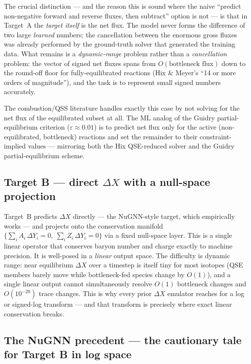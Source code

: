 \documentclass[11pt]{article}
\begin{document}
The crucial distinction --- and the reason this is sound where the naive ``predict non-negative forward and reverse fluxes, then subtract'' option is not --- is that in Target~A the \emph{target itself} is the net flux. The model never forms the difference of two large \emph{learned} numbers; the cancellation between the enormous gross fluxes was already performed by the ground-truth solver that generated the training data. What remains is a \emph{dynamic-range} problem rather than a \emph{cancellation} problem: the vector of signed net fluxes spans from $O(\text{bottleneck flux})$ down to the round-off floor for fully-equilibrated reactions (Hix \& Meyer's ``14 or more orders of magnitude''), and the task is to represent small signed numbers accurately.

The combustion/QSS literature handles exactly this case by not solving for the net flux of the equilibrated subset at all. The ML analog of the Guidry partial-equilibrium criterion ($\varepsilon \approx 0.01$) is to predict net flux only for the active (non-equilibrated, bottleneck) reactions and set the remainder to their constraint-implied values --- mirroring both the Hix QSE-reduced solver and the Guidry partial-equilibrium scheme.

\subsection{Target B --- direct \texorpdfstring{$\Delta X$}{DeltaX} with a null-space projection}

Target~B predicts $\Delta X$ directly --- the NuGNN-style target, which empirically works --- and projects onto the conservation manifold $\{\sum_i A_i\,\Delta Y_i = 0,\ \sum_i Z_i\,\Delta Y_i = 0\}$ via a fixed null-space layer. This is a single linear operator that conserves baryon number and charge exactly to machine precision. It is well-posed in a \emph{linear} output space. The difficulty is dynamic range: near equilibrium $\Delta X$ over a timestep is itself tiny for most isotopes (QSE members barely move while bottleneck-fed species change by $O(1)$), and a single linear output cannot simultaneously resolve $O(1)$ bottleneck changes and $O(10^{-20})$ trace changes. This is why every prior $\Delta X$ emulator reaches for a log or signed-log transform --- and that transform is precisely where exact linear conservation breaks.

\subsection{The NuGNN precedent --- the cautionary tale for Target B in log space}
\end{document}
